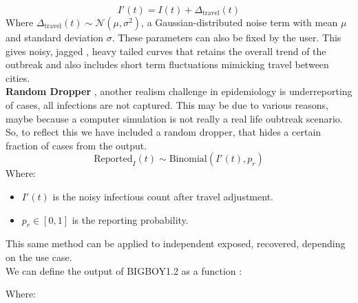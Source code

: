 \documentclass[11pt,a4paper]{article}
\theoremstyle{remark}\newtheorem{remark}{Remark}
\begin{document}
\begin{equation*}
I'(t) = I(t) + \Delta_{\text{travel}}(t)
\end{equation*}
Where $\Delta_{\text{travel}}(t) \sim \mathcal{N}(\mu, \sigma^2)$, a Gaussian-distributed noise term with mean $\mu$ and standard deviation $\sigma$. These parameters can also be fixed by the user. This gives noisy, jagged , heavy tailed curves that retains the overall trend of the outbreak and also includes short term fluctuations mimicking travel between cities. \\
\textbf{Random Dropper} , another realism challenge in epidemiology is underreporting of cases, all infections are not captured. This may be due to various reasons, maybe because a computer simulation is not really a real life oubtreak scenario. So, to reflect this we have included a random dropper, that hides a certain fraction of cases from the output. 
\begin{equation*}
\text{Reported}_I(t) \sim \text{Binomial}(I'(t), p_r)
\end{equation*}
Where:
\begin{itemize}
    \item $I'(t)$ is the noisy infectious count after travel adjustment.
    \item $p_r \in [0,1]$ is the reporting probability.
\end{itemize}
This same method can be applied to independent exposed, recovered, depending on the use case.\\
We can define the output of BIGBOY1.2 as a function : 
\begin{center} %
\end{center}
Where: 
\end{document}
